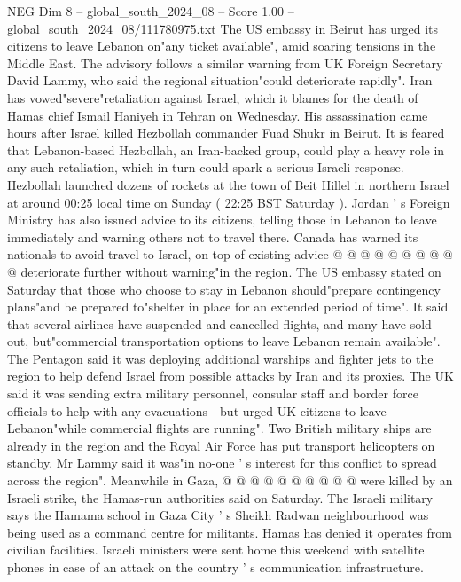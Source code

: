 \begin{textsample}{NEG Dim 8 – global\_south\_2024\_08 – Score 1.00 – global\_south\_2024\_08/111780975.txt}  \label{ex:f8_neg_290}
The US embassy in Beirut has urged its citizens to leave Lebanon on"any ticket available", amid soaring tensions in the Middle East.
The advisory follows a similar warning from UK Foreign Secretary David Lammy, who said the regional situation"could deteriorate rapidly".
Iran has vowed"severe"retaliation against Israel, which it blames for the death of Hamas chief Ismail Haniyeh in Tehran on Wednesday.
His assassination came hours after Israel killed Hezbollah commander Fuad Shukr in Beirut.
It is feared that Lebanon-based Hezbollah, an Iran-backed group, could play a heavy role in any such retaliation, which in turn could spark a serious Israeli response.
Hezbollah launched dozens of rockets at the town of Beit Hillel in northern Israel at around 00:25 local time on Sunday ( 22:25 BST Saturday ).
Jordan ' s Foreign Ministry has also issued advice to its citizens, telling those in Lebanon to leave immediately and warning others not to travel there.
Canada has warned its nationals to avoid travel to Israel, on top of existing advice @ @ @ @ @ @ @ @ @ @ deteriorate further without warning"in the region.
The US embassy stated on Saturday that those who choose to stay in Lebanon should"prepare contingency plans"and be prepared to"shelter in place for an extended period of time".
It said that several airlines have suspended and cancelled flights, and many have sold out, but"commercial transportation options to leave Lebanon remain available".
The Pentagon said it was deploying additional warships and fighter jets to the region to help defend Israel from possible attacks by Iran and its proxies.
The UK said it was sending extra military personnel, consular staff and border force officials to help with any evacuations - but urged UK citizens to leave Lebanon"while commercial flights are running".
Two British military ships are already in the region and the Royal Air Force has put transport helicopters on standby.
Mr Lammy said it was"in no-one ' s interest for this conflict to spread across the region".
Meanwhile in Gaza, @ @ @ @ @ @ @ @ @ @ were killed by an Israeli strike, the Hamas-run authorities said on Saturday.
The Israeli military says the Hamama school in Gaza City ' s Sheikh Radwan neighbourhood was being used as a command centre for militants.
Hamas has denied it operates from civilian facilities.
Israeli ministers were sent home this weekend with satellite phones in case of an attack on the country ' s communication infrastructure.

\end{textsample}
